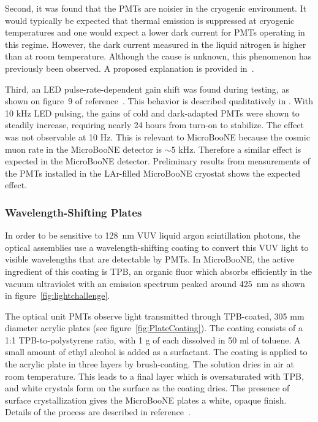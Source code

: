 Second, it was found that the PMTs are noisier in the cryogenic environment. 
It would typically be expected that thermal emission is suppressed at cryogenic temperatures and one would expect a lower dark current 
for PMTs operating in this regime.  
However, the dark current measured in the liquid nitrogen is higher than at room temperature. 
Although the cause is unknown, this phenomenon has previously been observed\cite{Meyer:2008qb}. A proposed explanation is provided in~\cite{MeyerDark}.

Third, an LED pulse-rate-dependent gain shift was found during testing, as shown on figure~9 of reference~\cite{Briese:2013wua}.  This behavior is described qualitatively in \cite{HamamatsuBook}.  With 10 kHz LED pulsing, the gains of cold and dark-adapted PMTs were shown to steadily increase, requiring nearly 24 hours from turn-on to stabilize. The effect was not observable at 10 Hz.   This is relevant to MicroBooNE because the
cosmic muon rate in the MicroBooNE detector is $\sim 5$ kHz.  Therefore a similar effect is expected in the MicroBooNE detector.  Preliminary results from measurements of the PMTs installed in the LAr-filled MicroBooNE cryostat shows the expected effect. 



\subsubsection{Wavelength-Shifting Plates}
\label{sec:wavelengthshift}


In order to be sensitive to 128~nm VUV liquid argon scintillation photons, the optical assemblies use a wavelength-shifting coating to convert this VUV light to visible wavelengths that are detectable by PMTs.  In MicroBooNE, the active ingredient of this coating is TPB, an organic fluor which absorbs efficiently in the vacuum ultraviolet with an emission spectrum peaked around 425~nm \cite{Burton:1973} as shown in figure~\ref{fig:lightchallenge}. 

The optical unit PMTs observe light transmitted through TPB-coated, 305 mm diameter acrylic plates (see figure~\ref{fig:PlateCoating}).
The coating consists of a 1:1 TPB-to-polystyrene ratio, with 1 g of each dissolved in 50 ml of toluene.  A small amount of ethyl alcohol is added as a surfactant.
The coating is applied to the acrylic plate in three layers by brush-coating.  The solution dries in air at room temperature.
This leads to a final layer which is oversaturated with TPB, and white crystals form on the surface as the coating dries.  The presence of surface crystallization gives the MicroBooNE plates a white, opaque finish. Details of the process are described in reference~\cite{Ignarra:2014yqa}.

